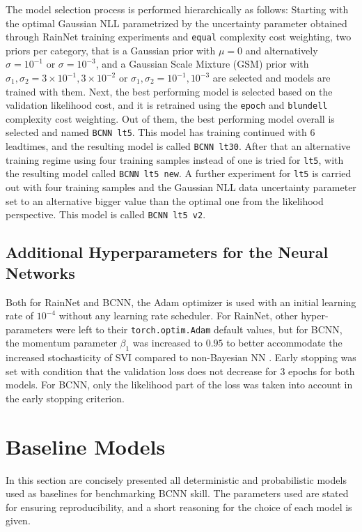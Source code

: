 The model selection process is performed hierarchically as follows: Starting with the optimal Gaussian NLL parametrized by the uncertainty parameter obtained through RainNet training experiments and \texttt{equal} complexity cost weighting, two priors per category, that is a Gaussian prior with $\mu = 0$ and alternatively $\sigma = 10^{-1}$ or $\sigma = 10^{-3}$, and a Gaussian Scale Mixture (GSM) prior with $\sigma_1, \sigma_2 = 3 \times 10^{-1}, 3 \times 10^{-2}$ or   $\sigma_1, \sigma_2 = 10^{-1}, 10^{-3}$ are selected and models are trained with them. Next, the best performing model is selected based on the validation likelihood cost, and it is retrained using the \texttt{epoch} and \texttt{blundell} complexity cost weighting. Out of them, the best performing model overall is selected and named \texttt{BCNN lt5}. This model has training continued with 6 leadtimes, and the resulting model is called \texttt{BCNN lt30}. After that an alternative training regime using four training samples instead of one is tried for \texttt{lt5}, with the resulting model called \texttt{BCNN lt5 new}. A further experiment for \texttt{lt5} is carried out with four training samples and the Gaussian NLL data uncertainty parameter set to an alternative bigger value than the optimal one from the likelihood perspective. This model is called \texttt{BCNN lt5 v2}.  

\subsection{Additional Hyperparameters for the Neural Networks}
\label{section:hyper}

 Both for RainNet and BCNN, the Adam optimizer is used with an initial learning rate of $10^{-4}$ without any learning rate scheduler. For RainNet, other hyper-parameters were left to their \texttt{torch.optim.Adam} default values, but for BCNN, the momentum parameter $\beta_1$ was increased to $0.95$ to better accommodate the increased stochasticity of SVI compared to non-Bayesian NN \cite{noauthor_svi_nodate}. Early stopping was set with condition that the validation loss does not decrease for 3 epochs for both models. For BCNN, only the likelihood part of the loss was taken into account in the early stopping criterion. 


\section{Baseline Models}

In this section are concisely presented all deterministic and probabilistic models used as baselines for benchmarking BCNN skill. The parameters used are stated for ensuring reproducibility, and a short reasoning for the choice of each model is given.

